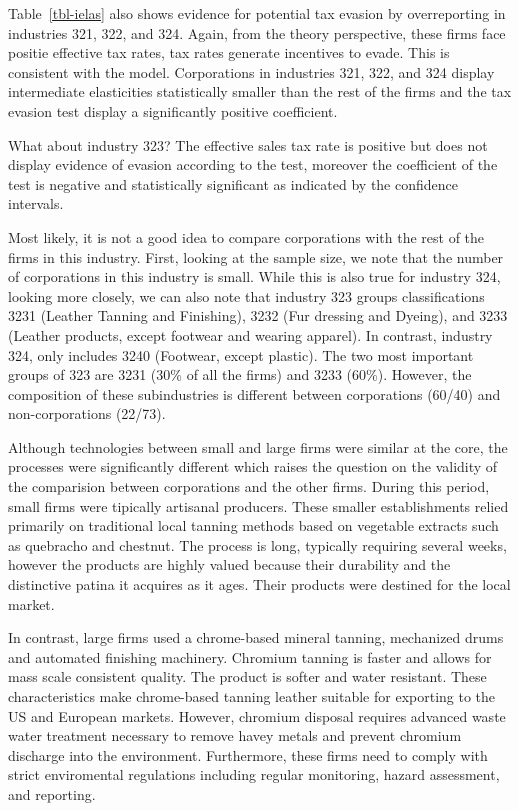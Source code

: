 \documentclass[
  12pt]{article}
\theoremstyle{definition}
\theoremstyle{remark}
\begin{document}
Table~\ref{tbl-ielas} also shows evidence for potential tax evasion by
overreporting in industries 321, 322, and 324. Again, from the theory
perspective, these firms face positie effective tax rates, tax rates
generate incentives to evade. This is consistent with the model.
Corporations in industries 321, 322, and 324 display intermediate
elasticities statistically smaller than the rest of the firms and the
tax evasion test display a significantly positive coefficient.

What about industry 323? The effective sales tax rate is positive but
does not display evidence of evasion according to the test, moreover the
coefficient of the test is negative and statistically significant as
indicated by the confidence intervals.

Most likely, it is not a good idea to compare corporations with the rest
of the firms in this industry. First, looking at the sample size, we
note that the number of corporations in this industry is small. While
this is also true for industry 324, looking more closely, we can also
note that industry 323 groups classifications 3231 (Leather Tanning and
Finishing), 3232 (Fur dressing and Dyeing), and 3233 (Leather products,
except footwear and wearing apparel). In contrast, industry 324, only
includes 3240 (Footwear, except plastic). The two most important groups
of 323 are 3231 (30\% of all the firms) and 3233 (60\%). However, the
composition of these subindustries is different between corporations
(60/40) and non-corporations (22/73).

Although technologies between small and large firms were similar at the
core, the processes were significantly different which raises the
question on the validity of the comparision between corporations and the
other firms. During this period, small firms were tipically artisanal
producers. These smaller establishments relied primarily on traditional
local tanning methods based on vegetable extracts such as quebracho and
chestnut. The process is long, typically requiring several weeks,
however the products are highly valued because their durability and the
distinctive patina it acquires as it ages. Their products were destined
for the local market.

In contrast, large firms used a chrome-based mineral tanning, mechanized
drums and automated finishing machinery. Chromium tanning is faster and
allows for mass scale consistent quality. The product is softer and
water resistant. These characteristics make chrome-based tanning leather
suitable for exporting to the US and European markets. However, chromium
disposal requires advanced waste water treatment necessary to remove
havey metals and prevent chromium discharge into the environment.
Furthermore, these firms need to comply with strict enviromental
regulations including regular monitoring, hazard assessment, and
reporting.
\end{document}
